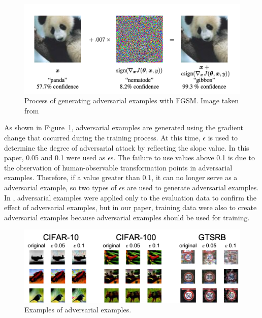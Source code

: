 \documentclass[journal,article,submit,moreauthors,pdftex]{Definitions/mdpi}
\begin{document}
\begin{figure}[H] 
\includegraphics[width=13cm]{Definitions/fgsm.png}
\caption{Process of generating adversarial examples with FGSM. Image taken from \cite{adversarial-goodfellow}\label{fgsm}}
\end{figure} 

As shown in Figure~\ref{fgsm}, adversarial examples are generated using the gradient change that occurred during the training process.
At this time, \begin{math}\epsilon\end{math} is used to determine the degree of adversarial attack by reflecting the slope value.
In this paper, 0.05 and 0.1 were used as \begin{math}\epsilon\end{math}s. The failure to use values above 0.1 is due to the observation of human-observable transformation points in adversarial examples.
Therefore, if a value greater than 0.1, it can no longer serve as a adversarial example, so two types of \begin{math}\epsilon\end{math}s are used to generate adversarial examples.
In \cite{adversarial-goodfellow}, adversarial examples were applied only to the evaluation data to confirm the effect of adversarial examples, but in our paper, training data were also to create adversarial examples because adversarial examples should be used for training.

\begin{figure}[H]
\includegraphics[width=13 cm]{Definitions/adversarial-dataset.png}
\caption{Examples of adversarial examples.\label{adversarial-examples}}
\end{figure} 
\end{document}
